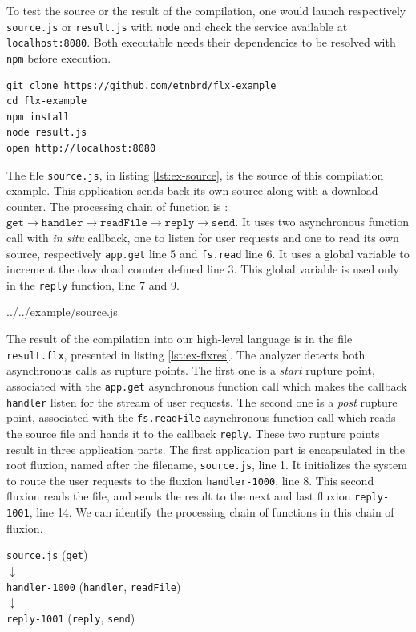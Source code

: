 To test the source or the result of the compilation, one would launch respectively \texttt{source.js} or \texttt{result.js} with \texttt{node} and check the service available at \texttt{localhost:8080}.
Both executable needs their dependencies to be resolved with \texttt{npm} before execution.
\begin{verbatim}
git clone https://github.com/etnbrd/flx-example
cd flx-example
npm install
node result.js
open http://localhost:8080
\end{verbatim}

The file \texttt{source.js}, in listing \ref{lst:ex-source}, is the source of this compilation example.
This application sends back its own source along with a download counter.
The processing chain of function is : $\texttt{get} \to \texttt{handler} \to \texttt{readFile} \to \texttt{reply} \to \texttt{send}$.
It uses two asynchronous function call with \textit{in situ} callback, one to listen for user requests and one to read its own source, respectively \texttt{app.get} line 5 and \texttt{fs.read} line 6.
It uses a global variable to increment the download counter defined line 3.
This global variable is used only in the \texttt{reply} function, line 7 and 9.

{../../example/source.js}

The result of the compilation into our high-level language is in the file \texttt{result.flx}, presented in listing \ref{lst:ex-flxres}.
The analyzer detects both asynchronous calls as rupture points.
The first one is a \textit{start} rupture point, associated with the \texttt{app.get} asynchronous function call which makes the callback \texttt{handler} listen for the stream of user requests. 
The second one is a \textit{post} rupture point, associated with the \texttt{fs.readFile} asynchronous function call which reads the source file and hands it to the callback \texttt{reply}.
These two rupture points result in three application parts.
The first application part is encapsulated in the root fluxion, named after the filename, \texttt{source.js}, line 1.
It initializes the system to route the user requests to the fluxion \texttt{handler-1000}, line 8.
This second fluxion reads the file, and sends the result to the next and last fluxion \texttt{reply-1001}, line 14.
We can identify the processing chain of functions in this chain of fluxion.

\begin{center}
\texttt{source.js} (\texttt{get})\\
$\downarrow$\\
\texttt{handler-1000} (\texttt{handler}, \texttt{readFile})\\
$\downarrow$\\
\texttt{reply-1001} (\texttt{reply}, \texttt{send})
\end{center}

